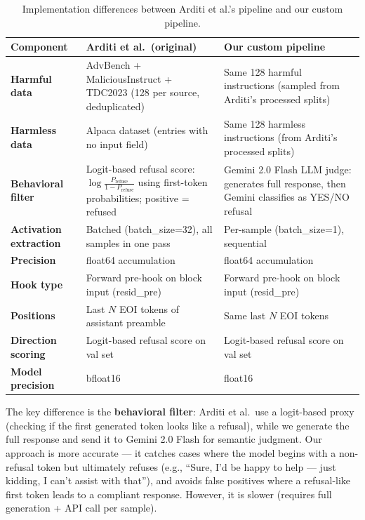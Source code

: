 \documentclass[11pt,a4paper]{article}
\begin{document}
\begin{table}[H]\centering
\caption{Implementation differences between Arditi et al.'s pipeline and our custom pipeline.}
\label{tab:pipeline_diff}
\begin{tabular}{p{3.5cm}p{5.5cm}p{5.5cm}}
\toprule
\textbf{Component} & \textbf{Arditi et al.\ (original)} & \textbf{Our custom pipeline} \\
\midrule
\textbf{Harmful data} & AdvBench + MaliciousInstruct + TDC2023 (128 per source, deduplicated) & Same 128 harmful instructions (sampled from Arditi's processed splits) \\
\textbf{Harmless data} & Alpaca dataset (entries with no input field) & Same 128 harmless instructions (from Arditi's processed splits) \\
\textbf{Behavioral filter} & Logit-based refusal score: $\log\frac{P_\text{refuse}}{1-P_\text{refuse}}$ using first-token probabilities; positive = refused & Gemini 2.0 Flash LLM judge: generates full response, then Gemini classifies as YES/NO refusal \\
\textbf{Activation extraction} & Batched (batch\_size=32), all samples in one pass & Per-sample (batch\_size=1), sequential \\
\textbf{Precision} & float64 accumulation & float64 accumulation \\
\textbf{Hook type} & Forward pre-hook on block input (resid\_pre) & Forward pre-hook on block input (resid\_pre) \\
\textbf{Positions} & Last $N$ EOI tokens of assistant preamble & Same last $N$ EOI tokens \\
\textbf{Direction scoring} & Logit-based refusal score on val set & Logit-based refusal score on val set \\
\textbf{Model precision} & bfloat16 & float16 \\
\bottomrule
\end{tabular}
\end{table}

The key difference is the \textbf{behavioral filter}: Arditi et al.\ use a logit-based proxy (checking if the first generated token looks like a refusal), while we generate the full response and send it to Gemini 2.0 Flash for semantic judgment. Our approach is more accurate --- it catches cases where the model begins with a non-refusal token but ultimately refuses (e.g., ``Sure, I'd be happy to help --- just kidding, I can't assist with that''), and avoids false positives where a refusal-like first token leads to a compliant response. However, it is slower (requires full generation + API call per sample).
\end{document}
